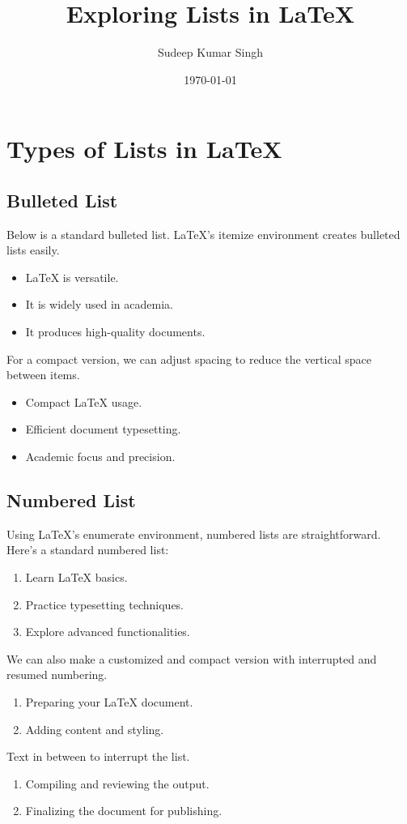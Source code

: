 \documentclass[12pt]{article}
\title{Exploring Lists in LaTeX}
\author{Sudeep Kumar Singh}
\date{\today}
\begin{document}
\maketitle

\section{Types of Lists in LaTeX}

\subsection{Bulleted List}
Below is a standard bulleted list. LaTeX's itemize environment creates bulleted lists easily.

\begin{itemize}
    \item LaTeX is versatile.
    \item It is widely used in academia.
    \item It produces high-quality documents.
\end{itemize}

For a compact version, we can adjust spacing to reduce the vertical space between items.

\begin{itemize}[noitemsep, topsep=0pt]
    \item Compact LaTeX usage.
    \item Efficient document typesetting.
    \item Academic focus and precision.
\end{itemize}

\subsection{Numbered List}
Using LaTeX’s enumerate environment, numbered lists are straightforward. Here’s a standard numbered list:

\begin{enumerate}
    \item Learn LaTeX basics.
    \item Practice typesetting techniques.
    \item Explore advanced functionalities.
\end{enumerate}

We can also make a customized and compact version with interrupted and resumed numbering.

\begin{enumerate}[noitemsep, topsep=0pt]
    \item Preparing your LaTeX document.
    \item Adding content and styling.
\end{enumerate}
Text in between to interrupt the list.
\begin{enumerate}[resume, noitemsep, topsep=0pt]
    \item Compiling and reviewing the output.
    \item Finalizing the document for publishing.
\end{enumerate}
\end{document}
